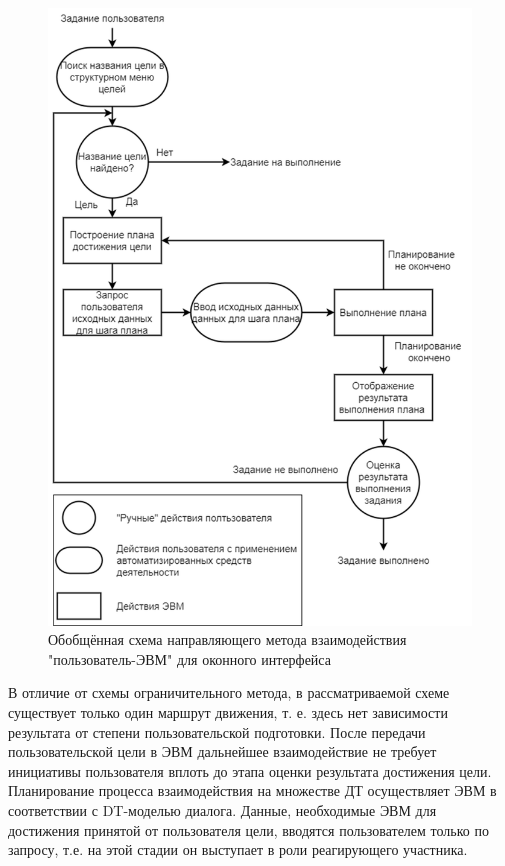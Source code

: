 \begin{figure}[!ht]
  \centering
  \includegraphics[scale=0.8]{ResearchNotes/rndhpc_int_gui_2022_10_10/rndhpcgui.2022.10.10.scheme2.png}
  \caption{Обобщённая схема направляющего метода взаимодействия "пользователь-ЭВМ" для оконного интерфейса}
  \label{rndhpcgui.2022.10.10.scheme2}
\end{figure}

	
В отличие от схемы ограничительного метода, в рассматриваемой схеме существует только один маршрут движения, т. е. здесь нет зависимости результата от степени пользовательской подготовки. После передачи пользовательской цели в ЭВМ дальнейшее взаимодействие не требует инициативы пользователя вплоть до этапа оценки результата достижения цели. Планирование процесса взаимодействия на множестве ДТ осуществляет ЭВМ в соответствии с DT-моделью диалога. Данные, необходимые ЭВМ для достижения принятой от пользователя цели, вводятся пользователем только по запросу, т.е. на этой стадии он выступает в роли реагирующего участника.

